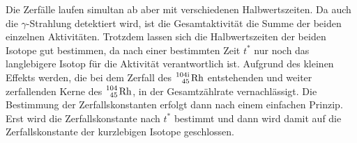 Die Zerfälle laufen simultan ab aber mit verschiedenen Halbwertszeiten. Da auch die $\gamma$-Strahlung detektiert wird, ist die Gesamtaktivität die Summe der beiden einzelnen Aktivitäten.
Trotzdem lassen sich die Halbwertszeiten der beiden Isotope gut bestimmen, da nach einer bestimmten Zeit $t^*$ nur noch das langlebigere Isotop für die Aktivität verantwortlich ist.
Aufgrund des kleinen Effekts werden, die bei dem Zerfall des $\ce{^{104\text{i}}_45 Rh}$ entstehenden und weiter zerfallenden Kerne des $\ce{^104_45 Rh}$, in der Gesamtzählrate vernachlässigt. 
Die Bestimmung der Zerfallskonstanten erfolgt dann nach einem einfachen Prinzip. Erst wird die Zerfallskonstante nach $t^*$ bestimmt und dann wird damit auf die Zerfallskonstante der kurzlebigen Isotope geschlossen.